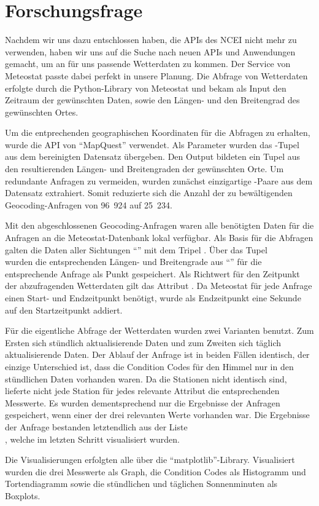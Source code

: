 \section{Forschungsfrage} \label{forschungsfrage}

Nachdem wir uns dazu entschlossen haben, die APIs des NCEI nicht mehr zu verwenden, haben wir uns auf die Suche nach neuen APIs und Anwendungen gemacht, um an für uns passende Wetterdaten zu kommen. Der Service von Meteostat passte dabei perfekt in unsere Planung. Die Abfrage von Wetterdaten erfolgte durch die Python-Library von Meteostat und bekam als Input den Zeitraum der gewünschten Daten, sowie den Längen- und den Breitengrad des gewünschten Ortes.

Um die entprechenden geographischen Koordinaten für die Abfragen zu erhalten, wurde die API von \enquote{MapQuest} verwendet. Als Parameter wurden das -Tupel aus dem bereinigten Datensatz übergeben. Den Output bildeten ein Tupel aus den resultierenden Längen- und Breitengraden der gewünschten Orte. Um redundante Anfragen zu vermeiden, wurden zunächst einzigartige -Paare aus dem Datensatz extrahiert. Somit reduzierte sich die Anzahl der zu bewältigenden Geocoding-Anfragen von 96~924 auf 25~234.

Mit den abgeschlossenen Geocoding-Anfragen waren alle benötigten Daten für die Anfragen an die Meteostat-Datenbank lokal verfügbar. Als Basis für die Abfragen galten die Daten aller Sichtungen \enquote{} mit dem Tripel . Über das Tupel \\ wurden die entsprechenden Längen- und Breitengrade aus \enquote{} für die entsprechende Anfrage als Punkt gespeichert. Als Richtwert für den Zeitpunkt der abzufragenden Wetterdaten gilt das Attribut . Da Meteostat für jede Anfrage einen Start- und Endzeitpunkt benötigt, wurde als Endzeitpunkt eine Sekunde auf den Startzeitpunkt addiert.

Für die eigentliche Abfrage der Wetterdaten wurden zwei Varianten benutzt. Zum Ersten sich stündlich aktualisierende Daten und zum Zweiten sich täglich aktualisierende Daten. Der Ablauf der Anfrage ist in beiden Fällen identisch, der einzige Unterschied ist, dass die Condition Codes für den Himmel nur in den stündlichen Daten vorhanden waren. Da die Stationen nicht identisch sind, lieferte nicht jede Station für jedes relevante Attribut die entsprechenden Messwerte. Es wurden dementsprechend nur die Ergebnisse der Anfragen gespeichert, wenn einer der drei relevanten Werte vorhanden war. Die Ergebnisse der Anfrage bestanden letztendlich aus der Liste \\, welche im letzten Schritt visualisiert wurden.

Die Visualisierungen erfolgten alle über die \enquote{matplotlib}-Library. Visualisiert wurden die drei Messwerte als Graph, die Condition Codes als Histogramm und Tortendiagramm sowie die stündlichen und täglichen Sonnenminuten als Boxplots.